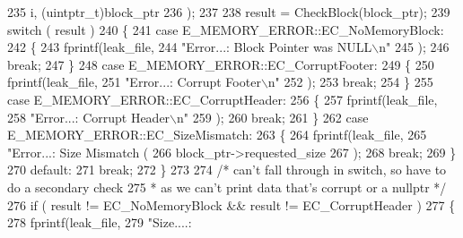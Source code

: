 \begin{DoxyCode}
{{{{{{{{{235                         i, (uintptr\_t)block\_ptr
236                 );
237 
238                 result = CheckBlock(block\_ptr);
239                 \textcolor{keywordflow}{switch} ( result )
240                 \{
241                 \textcolor{keywordflow}{case} E_MEMORY_ERROR::EC_NoMemoryBlock:
242                         \{
243                                 fprintf(leak\_file,
244                                         \textcolor{stringliteral}{"Error...: Block Pointer was NULL\(\backslash\)n"}
245                                 );
246                                 \textcolor{keywordflow}{break};
247                         \}
248                 \textcolor{keywordflow}{case} E_MEMORY_ERROR::EC_CorruptFooter:
249                         \{
250                                 fprintf(leak\_file,
251                                         \textcolor{stringliteral}{"Error...: Corrupt Footer\(\backslash\)n"}
252                                 );
253                                 \textcolor{keywordflow}{break};
254                         \}
255                 \textcolor{keywordflow}{case} E_MEMORY_ERROR::EC_CorruptHeader:
256                         \{
257                                 fprintf(leak\_file,
258                                         \textcolor{stringliteral}{"Error...: Corrupt Header\(\backslash\)n"}
259                                 );
260                                 \textcolor{keywordflow}{break};
261                         \}
262                 \textcolor{keywordflow}{case} E_MEMORY_ERROR::EC_SizeMismatch:
263                         \{
264                                 fprintf(leak\_file,
265                                         \textcolor{stringliteral}{"Error...: Size Mismatch (%
266                                         block\_ptr->requested\_size
267                                 );
268                                 \textcolor{keywordflow}{break};
269                         \}
270                 \textcolor{keywordflow}{default}:
271                         \textcolor{keywordflow}{break};
272                 \}
273 
274                 \textcolor{comment}{/* can't fall through in switch, so have to do a secondary check
}
275 \textcolor{comment}{                 * as we can't print data that's corrupt or a nullptr */}
276                 \textcolor{keywordflow}{if} ( result != EC_NoMemoryBlock && result != EC_CorruptHeader )
277                 \{
278                         fprintf(leak\_file,
279                                 \textcolor{stringliteral}{"Size....: %
}}}}}}}}}}}
\end{DoxyCode}
